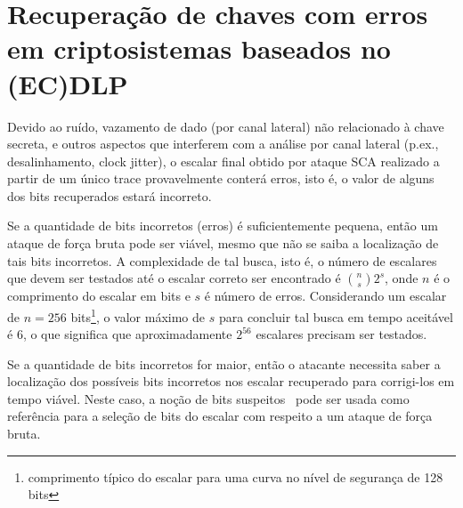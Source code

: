 
\section{Recuperação de chaves com erros em criptosistemas baseados no (EC)DLP}

%
Devido ao ruído, vazamento de dado (por canal lateral) não relacionado à chave secreta, e outros aspectos que interferem com a análise por canal lateral (p.ex., desalinhamento, clock jitter), o escalar final obtido por ataque SCA realizado a partir de um único trace provavelmente conterá erros, isto é, o valor de alguns dos bits recuperados estará incorreto.

%
%
Se a quantidade de bits incorretos (erros) é suficientemente pequena, então um ataque de força bruta pode ser viável, mesmo que não se saiba a localização de tais bits incorretos. A complexidade de tal busca, isto é, o número de escalares que devem ser testados até o escalar correto ser encontrado é ${{n}\choose{s}} 2^s$, onde $n$ é o comprimento do escalar em bits e $s$ é número de erros. Considerando um escalar de $n = 256$ bits\footnote{comprimento típico do escalar para uma curva no nível de segurança de 128 bits}, o valor máximo de $s$ para concluir tal busca em tempo aceitável é 6, o que significa que aproximadamente $2^{56}$ escalares precisam ser testados.

%
%
Se a quantidade de bits incorretos for maior, então o atacante necessita saber a localização dos possíveis bits incorretos nos escalar recuperado para corrigi-los em tempo viável.
%
%
Neste caso, a noção de bits suspeitos~ pode ser usada como referência para a seleção de bits do escalar com respeito a um ataque de força bruta. 
%

\newcommand{\scalarlen}{254}

